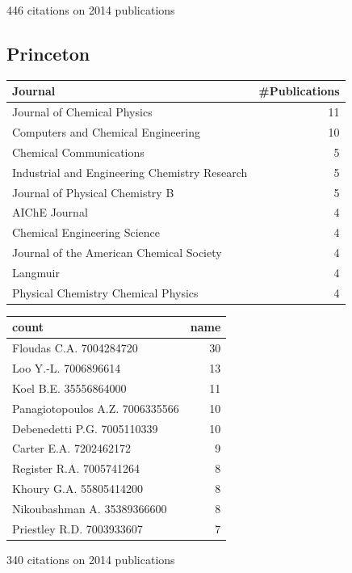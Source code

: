\documentclass[11pt]{article}
\begin{document}
446 citations on 2014 publications

\subsection{Princeton}
\label{sec-1-10}
\begin{center}
\begin{tabular}{lr}
Journal & \#Publications\\
\hline
Journal of Chemical Physics & 11\\
Computers and Chemical Engineering & 10\\
Chemical Communications & 5\\
Industrial and Engineering Chemistry Research & 5\\
Journal of Physical Chemistry B & 5\\
AIChE Journal & 4\\
Chemical Engineering Science & 4\\
Journal of the American Chemical Society & 4\\
Langmuir & 4\\
Physical Chemistry Chemical Physics & 4\\
\end{tabular}
\end{center}

\begin{center}
\begin{tabular}{lr}
count & name\\
\hline
Floudas C.A. 7004284720 & 30\\
Loo Y.-L. 7006896614 & 13\\
Koel B.E. 35556864000 & 11\\
Panagiotopoulos A.Z. 7006335566 & 10\\
Debenedetti P.G. 7005110339 & 10\\
Carter E.A. 7202462172 & 9\\
Register R.A. 7005741264 & 8\\
Khoury G.A. 55805414200 & 8\\
Nikoubashman A. 35389366600 & 8\\
Priestley R.D. 7003933607 & 7\\
\end{tabular}
\end{center}

340 citations on 2014 publications
\end{document}
